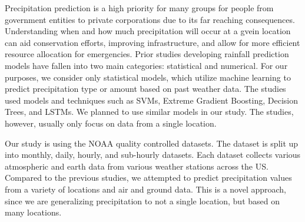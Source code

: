 \documentclass[../report.tex]{subfiles}
\begin{document}
Precipitation prediction is a high priority for many groups for people from government entities to private corporations due to its far reaching consequences. Understanding when and how much precipitation will occur at a gvein location can aid conservation efforts, improving infrastructure, and allow for more efficient resource allocation for emergencies. Prior studies developing rainfall prediction models have fallen into two main categories: statistical and numerical. For our purposes, we consider only statistical models, which utilize machine learning to predict precipitation type or amount based on past weather data. 
The studies used models and techniques such as SVMs, Extreme Gradient Boosting, Decision Trees, and LSTMs. \cite*{liyew_machine_2021,barrera-animas_rainfall_2022,rahman_rainfall_2022}
We planned to use similar models in our study.
The studies, however, usually only focus on data from a single location.

Our study is using the NOAA quality controlled datasets. \cite*{diamond_us_2013}
The dataset is split up into monthly, daily, hourly, and sub-hourly datasets.
Each dataset collects various atmospheric and earth data from various weather stations across the US.
Compared to the previous studies, we attempted to predict precipitation values from a variety of locations and air and ground data.
This is a novel approach, since we are generalizing precipitation to not a single location, but based on many locations.
\end{document}
